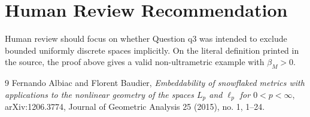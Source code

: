 \documentclass[11pt]{article}
\begin{document}
\section*{Human Review Recommendation}

Human review should focus on whether Question \(\mathrm{q3}\) was intended to
exclude bounded uniformly discrete spaces implicitly.  On the literal
definition printed in the source, the proof above gives a valid non-ultrametric
example with \(\beta_M>0\).

\begin{thebibliography}{9}
Fernando Albiac and Florent Baudier,
\emph{Embeddability of snowflaked metrics with applications to the nonlinear
geometry of the spaces \(L_p\) and \(\ell_p\) for \(0<p<\infty\)},
arXiv:1206.3774, Journal of Geometric Analysis 25 (2015), no. 1, 1--24.
\end{thebibliography}
\end{document}
